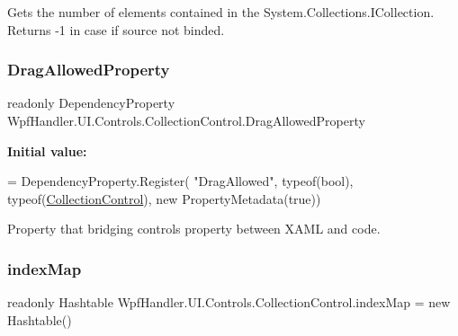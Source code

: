 Gets the number of elements contained in the System.\+Collections.\+I\+Collection. Returns -\/1 in case if source not binded. 

\mbox{\label{class_wpf_handler_1_1_u_i_1_1_controls_1_1_collection_control_aea4afe7ae229937f9c99809d720d8875}} 
\subsubsection{\texorpdfstring{Drag\+Allowed\+Property}{DragAllowedProperty}}
{\footnotesize\ttfamily readonly Dependency\+Property Wpf\+Handler.\+U\+I.\+Controls.\+Collection\+Control.\+Drag\+Allowed\+Property\hspace{0.3cm}{\ttfamily [static]}}

{\bfseries Initial value\+:}
\begin{DoxyCode}
= DependencyProperty.Register(
          \textcolor{stringliteral}{"DragAllowed"}, typeof(\textcolor{keywordtype}{bool}), typeof(\mbox{\hyperlink{class_wpf_handler_1_1_u_i_1_1_controls_1_1_collection_control_a5228b3f2d5efec75b178a160bfd9a558}{CollectionControl}}),
          \textcolor{keyword}{new} PropertyMetadata(\textcolor{keyword}{true}))
\end{DoxyCode}


Property that bridging control\textquotesingle{}s property between X\+A\+ML and code. 

\mbox{\label{class_wpf_handler_1_1_u_i_1_1_controls_1_1_collection_control_af3a8d4c03474bbb80d8d461f4a8e33e8}} 
\subsubsection{\texorpdfstring{index\+Map}{indexMap}}
{\footnotesize\ttfamily readonly Hashtable Wpf\+Handler.\+U\+I.\+Controls.\+Collection\+Control.\+index\+Map = new Hashtable()\hspace{0.3cm}{\ttfamily [protected]}}



